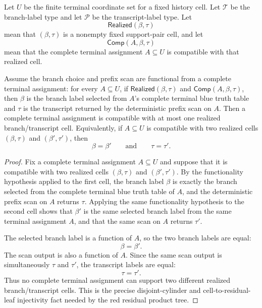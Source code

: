 \begin{helper}
Let \(U\) be the finite terminal coordinate set for a fixed history cell.
Let \(\mathcal T\) be the branch-label type and let \(\mathcal P\) be the
transcript-label type.  Let
\[
\mathsf{Realized}(\beta,\tau)
\]
mean that \((\beta,\tau)\) is a nonempty fixed support-pair cell, and let
\[
\mathsf{Comp}(A,\beta,\tau)
\]
mean that the complete terminal assignment \(A\subseteq U\) is compatible
with that realized cell.

Assume the branch choice and prefix scan are functional from a complete
terminal assignment: for every \(A\subseteq U\), if
\(\mathsf{Realized}(\beta,\tau)\) and
\(\mathsf{Comp}(A,\beta,\tau)\), then \(\beta\) is the branch label selected
from \(A\)'s complete terminal blue truth table and \(\tau\) is the
transcript returned by the deterministic prefix scan on \(A\).
Then a complete terminal assignment is compatible with at most one realized
branch/transcript cell.  Equivalently, if \(A\subseteq U\) is compatible
with two realized cells \((\beta,\tau)\) and \((\beta',\tau')\), then
\[
\beta=\beta'\qquad\text{and}\qquad \tau=\tau'.
\]
\end{helper}
\begin{proof}
Fix a complete terminal assignment \(A\subseteq U\) and suppose that it is
compatible with two realized cells \((\beta,\tau)\) and
\((\beta',\tau')\).  By the functionality hypothesis applied to the first
cell, the branch label \(\beta\) is exactly the branch selected from the
complete terminal blue truth table of \(A\), and the deterministic prefix
scan on \(A\) returns \(\tau\).  Applying the same functionality hypothesis
to the second cell shows that \(\beta'\) is the same selected branch label
from the same terminal assignment \(A\), and that the same scan on \(A\)
returns \(\tau'\).

The selected branch label is a function of \(A\), so the two branch labels
are equal:
\[
\beta=\beta'.
\]
The scan output is also a function of \(A\).  Since the same scan output is
simultaneously \(\tau\) and \(\tau'\), the transcript labels are equal:
\[
\tau=\tau'.
\]
Thus no complete terminal assignment can support two different realized
branch/transcript cells.  This is the precise disjoint-cylinder and
cell-to-residual-leaf injectivity fact needed by the red residual product
tree.
\end{proof}
